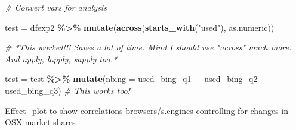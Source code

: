 \documentclass[
  11pt,
]{article}
\newenvironment{Shaded}{\begin{snugshade}}{\end{snugshade}}
\newcommand{\AttributeTok}[1]{\textcolor[rgb]{0.13,0.29,0.53}{#1}}
\newcommand{\CommentTok}[1]{\textcolor[rgb]{0.56,0.35,0.01}{\textit{#1}}}
\newcommand{\FunctionTok}[1]{\textcolor[rgb]{0.13,0.29,0.53}{\textbf{#1}}}
\newcommand{\NormalTok}[1]{#1}
\newcommand{\OtherTok}[1]{\textcolor[rgb]{0.56,0.35,0.01}{#1}}
\newcommand{\SpecialCharTok}[1]{\textcolor[rgb]{0.81,0.36,0.00}{\textbf{#1}}}
\newcommand{\StringTok}[1]{\textcolor[rgb]{0.31,0.60,0.02}{#1}}
\begin{document}
\begin{Shaded}
\begin{Highlighting}[]
\CommentTok{\# Convert vars for analysis}

\NormalTok{test }\OtherTok{=}\NormalTok{ dfexp2 }\SpecialCharTok{\%\textgreater{}\%} 
  \FunctionTok{mutate}\NormalTok{(}\FunctionTok{across}\NormalTok{(}\FunctionTok{starts\_with}\NormalTok{(}\StringTok{"used"}\NormalTok{), as.numeric)) }

\CommentTok{\#\textquotesingle{} *This worked!!! Saves a lot of time. Mind I should use "across" much more. And apply, lapply, sapply too.*}

\NormalTok{test }\OtherTok{=}\NormalTok{ test }\SpecialCharTok{\%\textgreater{}\%} 
  \FunctionTok{mutate}\NormalTok{(}\AttributeTok{nbing =}\NormalTok{ used\_bing\_q1 }\SpecialCharTok{+}\NormalTok{ used\_bing\_q2 }\SpecialCharTok{+}\NormalTok{ used\_bing\_q3) }\CommentTok{\# This works too!}
\end{Highlighting}
\end{Shaded}

Effect\_plot to show correlations browsers/s.engines controlling for changes in OSX market shares
\end{document}
